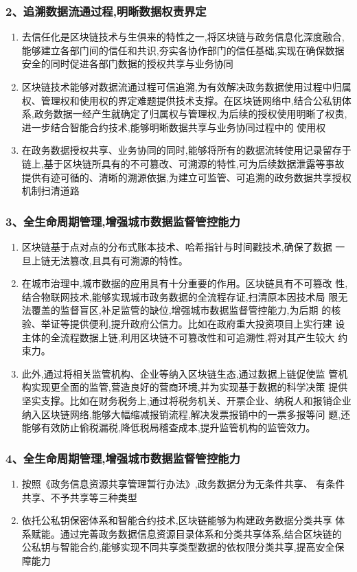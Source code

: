 \documentclass[11pt]{beamer}
\begin{document}
\begin{frame}
	\frametitle{2、追溯数据流通过程,明晰数据权责界定}
	\begin{enumerate}
		\item 去信任化是区块链技术与生俱来的特性之一,将区块链与政务信息化深度融合,能够建立各部门间的信任和共识,夯实各协作部门的信任基础,实现在确保数据安全的同时促进各部门数据的授权共享与业务协同
		\item 区块链技术能够对数据流通过程可信追溯,为有效解决政务数据使用过程中归属权、管理权和使用权的界定难题提供技术支撑。在区块链网络中,结合公私钥体系,政务数据一经产生就确定了归属权与管理权,为后续的授权使用明晰了权责,进一步结合智能合约技术,能够明晰数据共享与业务协同过程中的
		使用权
		\item 在政务数据授权共享、业务协同的同时,能够将所有的数据流转使用记录留存于链上,基于区块链所具有的不可篡改、可溯源的特性,可为后续数据泄露等事故提供有迹可循的、清晰的溯源依据,为建立可监管、可追溯的政务数据共享授权机制扫清道路
	\end{enumerate}
\end{frame}

\begin{frame}
	\frametitle{3、全生命周期管理,增强城市数据监督管控能力}
	\begin{enumerate}
		\item 区块链基于点对点的分布式账本技术、哈希指针与时间戳技术,确保了数据
		一旦上链无法篡改,且具有可溯源的特性。
		\item 在城市治理中,城市数据的应用具有十分重要的作用。区块链具有不可篡改
		性,结合物联网技术,能够实现城市政务数据的全流程存证,扫清原本因技术局
		限无法覆盖的监督盲区,补足监管的缺位,增强城市数据监督管控能力,为后期
		的核验、举证等提供便利,提升政府公信力。比如在政府重大投资项目上实行建
		设主体的全流程数据上链,利用区块链不可篡改性和可追溯性,将对其产生较大
		约束力。
		\item 此外,通过将相关监管机构、企业等纳入区块链生态,通过数据上链促使监
		管机构实现更全面的监管,营造良好的营商环境,并为实现基于数据的科学决策
		提供坚实支撑。比如在财务税务上,通过将税务机关、开票企业、纳税人和报销企业纳入区块链网络,能够大幅缩减报销流程,解决发票报销中的一票多报等问
		题,还能够有效防止偷税漏税,降低税局稽查成本,提升监管机构的监管效力。
	\end{enumerate}
\end{frame}

\begin{frame}
	\frametitle{4、全生命周期管理,增强城市数据监督管控能力}
	\begin{enumerate}
		\item 按照《政务信息资源共享管理暂行办法》,政务数据分为无条件共享、
		有条件共享、不予共享等三种类型
		\item 依托公私钥保密体系和智能合约技术,区块链能够为构建政务数据分类共享
		体系赋能。通过完善政务数据信息资源目录体系和分类共享体系,结合区块链的
		公私钥与智能合约,能够实现不同共享类型数据的依权限分类共享,提高安全保
		障能力
	\end{enumerate}
	\end{frame}
\end{document}
